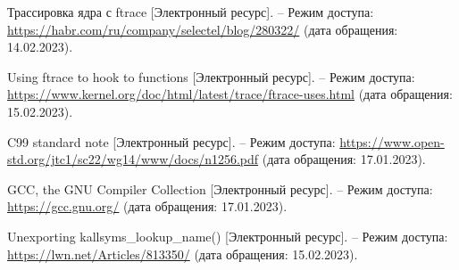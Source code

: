 \begin{thebibliography}{}

Трассировка ядра с ftrace [Электронный ресурс]. -- Режим доступа: \url {https://habr.com/ru/company/selectel/blog/280322/} (дата обращения: 14.02.2023).


Using ftrace to hook to functions [Электронный ресурс]. -- Режим доступа: \url {https://www.kernel.org/doc/html/latest/trace/ftrace-uses.html} (дата обращения: 15.02.2023).


C99 standard note [Электронный ресурс]. -- Режим доступа: \url {https://www.open-std.org/jtc1/sc22/wg14/www/docs/n1256.pdf} (дата обращения: 17.01.2023).


GCC, the GNU Compiler Collection [Электронный ресурс]. -- Режим доступа: \url {https://gcc.gnu.org/} (дата обращения: 17.01.2023).


Unexporting kallsyms\_lookup\_name() [Электронный ресурс]. -- Режим доступа: \url {https://lwn.net/Articles/813350/} (дата обращения: 15.02.2023).

\end{thebibliography}
\endgroup